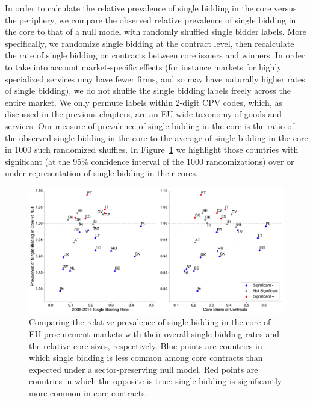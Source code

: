 In order to calculate the relative prevalence of single bidding in the core versus the periphery, we compare the observed relative prevalence of single bidding in the core to that of a null model with randomly shuffled single bidder labels. More specifically, we randomize single bidding at the contract level, then recalculate the rate of single bidding on contracts between core issuers and winners. In order to take into account market-specific effects (for instance markets for highly specialized services may have fewer firms, and so may have naturally higher rates of single bidding), we do not shuffle the single bidding labels freely across the entire market. We only permute labels within 2-digit CPV codes, which, as discussed in the previous chapters, are an EU-wide taxonomy of goods and services. Our measure of prevalence of single bidding in the core is the ratio of the observed single bidding in the core to the average of single bidding in the core in 1000 such randomized shuffles. In Figure~\ref{fig:core_sb} we highlight those countries with significant (at the 95\% confidence interval of the 1000 randomizations) over or under-representation of single bidding in their cores. 

\begin{figure}
\centering
  \includegraphics[width=\textwidth]{images/ted_networks/coresb_comparison.pdf}
  \caption[Prevalence of single bidding in cores.]{Comparing the relative prevalence of single bidding in the core of EU procurement markets with their overall single bidding rates and the relative core sizes, respectively. Blue points are countries in which single bidding is less common among core contracts than expected under a sector-preserving null model. Red points are countries in which the opposite is true: single bidding is significantly more common in core contracts.}
  \label{fig:core_sb}
\end{figure}

